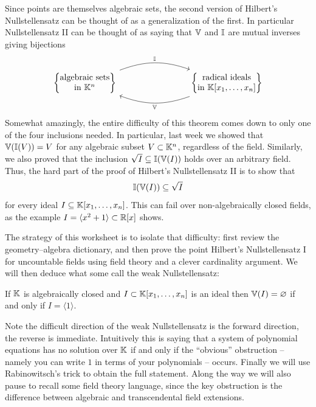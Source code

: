 \documentclass[Notebook.tex]{subfiles}
\begin{document}
Since points are themselves algebraic sets, the second version of Hilbert's Nullstellensatz can be thought of as a generalization of the first. In particular Nullstellensatz II can be thought of as saying that $\mathbb V$ and $\mathbb I$ are mutual inverses giving bijections
\[
\begin{tikzcd}[row sep = .5 em, column sep = 8em]
\left\{ \begin{matrix} 
\text{algebraic sets} \\
\text{in $\K^n$}
\end{matrix} \right\} \arrow[r, bend left=20, "\I"] & \arrow[l,bend left=20,"\V"]
\left\{ \begin{matrix} 
\text{radical ideals} \\
\text{in $\K[x_1,\ldots,x_n]$}
\end{matrix} \right\} 
\end{tikzcd}
\]
Somewhat amazingly, the entire difficulty of this theorem comes down to only one of the four inclusions needed. In particular, last week we showed that $\mathbb V(\mathbb I(V))=V$ for any algebraic subset $V\subset \mathbb K^n$, regardless of the field. Similarly, we also proved that the inclusion $\sqrt{I}\subseteq \mathbb I(\mathbb V(I))$ holds over an arbitrary field. Thus, the hard part of the proof of Hilbert's Nullstellensatz II is to show that
\[
\mathbb I(\mathbb V(I))\subseteq \sqrt{I}
\]
for every ideal $I\subseteq \mathbb K[x_1,\ldots,x_n]$. This can fail over non-algebraically closed fields, as the example $I=\langle x^2+1\rangle \subset \mathbb R[x]$ shows.

The strategy of this worksheet is to isolate that difficulty: first review the geometry--algebra dictionary, and then prove the point Hilbert's Nullstellensatz I for uncountable fields using field theory and a clever cardinality argument. We will then deduce what some call the weak Nullstellensatz:

 \begin{theorem} If $\mathbb K$ is algebraically closed and $I\subset \mathbb K[x_1,\ldots,x_n]$ is an ideal then $\mathbb V(I)=\varnothing$ if and only if $I = \langle 1 \rangle$.
\end{theorem}

Note the difficult direction of the weak Nullstellensatz is the forward direction, the reverse is immediate. Intuitively this is saying that a system of polynomial equations has no solution over $\mathbb K$ if and only if the ``obvious'' obstruction -- namely you can write $1$ in terms of your polynomials -- occurs.  Finally we will  use Rabinowitsch's trick to obtain the full statement. Along the way we will also pause to recall some field theory language, since the key obstruction is the difference between algebraic and transcendental field extensions.
\end{document}
